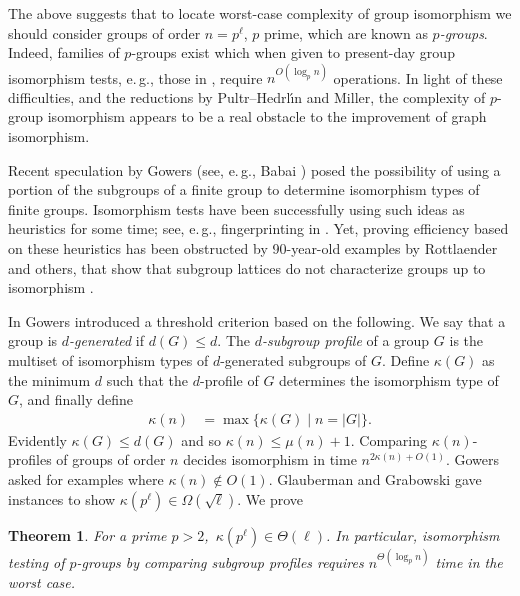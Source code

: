 \documentclass[11pt]{article}
\numberwithin{equation}{section}
\theoremstyle{definition}
\theoremstyle{plain}
\newcommand{\eg}{e.\,g.}
\numberwithin{equation}{section}
\theoremstyle{plain}       %
\newtheorem{thm}[equation]{Theorem}
\theoremstyle{remark}
\theoremstyle{definition}
\numberwithin{figure}{section}
\numberwithin{table}{section}
\begin{document}
The above suggests that to locate worst-case complexity of group isomorphism we
should consider groups of order $n=p^{\ell}$, $p$ prime, which are known as
\emph{$p$-groups}.  Indeed, families of $p$-groups exist which when given to
present-day group isomorphism tests, \eg, those in \cite{ELGOB}, require
$n^{O(\log_p n)}$ operations.  In light of these difficulties, and the
reductions by Pultr--Hedrl{\'\i}n and Miller, the complexity of $p$-group
isomorphism appears to be a real obstacle to the improvement of graph
isomorphism. 

Recent speculation by Gowers \cite{Gowers:blog} 
%
(see, \eg, Babai \cite[p.   %
693]{Babai:graph}) posed the possibility of using a portion of the subgroups of
a finite group to determine isomorphism types of finite groups.  Isomorphism
tests have been successfully using such ideas as heuristics for some time; 
%
see, \eg, fingerprinting in \cite{ELGOB}.   %
Yet, proving efficiency based on these
heuristics has been obstructed by 90-year-old examples by Rottlaender and
others, that show that subgroup lattices do not characterize groups up to
isomorphism \cite{Rottlaender}.

In \cite{Gowers:blog} Gowers introduced a threshold criterion based on the
following.  We say that a group is \emph{$d$-generated} if $d(G)\le d$. The
\emph{$d$-subgroup profile} of a group $G$ is the multiset of isomorphism types
of $d$-generated subgroups of $G$.  Define $\kappa(G)$ as the minimum $d$ such
that the $d$-profile of $G$ determines the isomorphism type of $G$, and finally
define
\begin{align*}
	\kappa(n) & = \max\{\kappa (G) \mid n=|G|\}.
\end{align*}
Evidently $\kappa(G)\leq d(G)$ and so $\kappa(n)\leq\mu(n)+1$. Comparing
$\kappa(n)$-profiles of groups of order $n$ decides isomorphism in time
$n^{2\kappa(n)+O(1)}$.   Gowers asked for examples where $\kappa(n)\notin O(1)$.
Glauberman and Grabowski \cite{GG} gave instances to show $\kappa(p^{\ell})\in
\Omega(\sqrt{\ell})$. We prove
\begin{thm}\label{thm:main-0}
For a prime $p>2$,\ $\kappa(p^{\ell})\in \Theta(\ell)$. In particular,
isomorphism testing of $p$-groups by comparing subgroup profiles requires
$n^{\Theta(\log_p n)}$ time in the worst case.
\end{thm}
\end{document}
